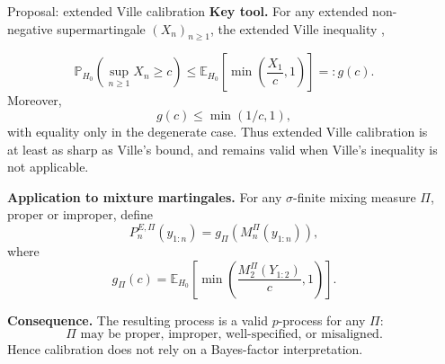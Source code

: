 \documentclass[final]{beamer}
\newcommand{\E}{\mathbb{E}}
\newcommand{\Prob}{\mathbb{P}}
\newlength{\sepwidth}
\newlength{\colwidth}
\newcommand{\separatorcolumn}{\begin{column}{\sepwidth}\end{column}}
\begin{document}
\begin{frame}[t]
\begin{columns}[t]
\separatorcolumn

\begin{column}{\colwidth}
\begin{alertblock}{Proposal: extended Ville calibration}
\textbf{Key tool.} For any extended non-negative supermartingale $(X_n)_{n\ge 1}$, the \alert{extended Ville inequality} \cite{wang2025extended},

\[ \Prob_{H_0}\!\left(\sup_{n\ge 1} X_n \ge c\right) \le \E_{H_0}\!\left[\min\!\left(\frac{X_1}{c},1\right)\right] =: g(c). \] 
Moreover, \[ g(c) \le \min(1/c,1), \] with equality only in the degenerate case. Thus extended Ville calibration is at least as sharp as Ville's bound, and remains valid when Ville's inequality is not applicable.

  \vspace{0.10cm}
  \textbf{Application to mixture martingales.} For any $\sigma$-finite mixing measure $\Pi$, proper or improper, define \[ P_n^{E,\Pi}(y_{1:n}) = g_\Pi\!\left(M_n^\Pi(y_{1:n})\right), \] where \[ g_\Pi(c) = \E_{H_0}\!\left[ \min\!\left( \frac{M_2^\Pi(Y_{1:2})}{c},1 \right) \right]. \]

  \vspace{0.10cm}
  \textbf{Consequence.} The resulting process is a valid $p$-process for any $\Pi$: \[ \Pi \text{ may be proper, improper, well-specified, or misaligned.} \] Hence calibration does not rely on a Bayes-factor interpretation. 
  

\end{alertblock}
\end{column}
\end{columns}
\end{frame}
\end{document}
